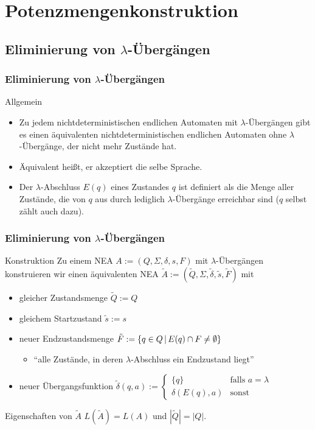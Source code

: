 \section{Potenzmengenkonstruktion}
\subsection{Eliminierung von $\lambda$-Übergängen}
\begin{frame}
	\frametitle{Eliminierung von $\lambda$-Übergängen}
	\begin{block}{Allgemein}
	\begin{itemize}
	 \item Zu jedem nichtdeterministischen endlichen Automaten mit $\lambda$-Übergängen gibt es einen äquivalenten nichtdeterministischen
	 endlichen Automaten ohne $\lambda$-Übergänge, der nicht mehr Zustände hat.
	 \item Äquivalent heißt, er akzeptiert die selbe Sprache.
	\item Der $\lambda$-Abschluss $E(q)$ eines Zustandes $q$ ist definiert als die Menge aller Zustände, die von $q$ aus durch lediglich $\lambda$-Übergänge erreichbar sind ($q$ selbst zählt auch dazu).
	\end{itemize}
	\end{block}
\end{frame}
\begin{frame}
\frametitle{Eliminierung von $\lambda$-Übergängen}
	\begin{block}{Konstruktion}
	Zu einem NEA \(A := (Q, \Sigma, \delta, s, F)\) mit $\lambda$-Übergängen konstruieren wir einen 
	  äquivalenten NEA \(\tilde{A} := (\tilde{Q}, \Sigma, \tilde{\delta}, \tilde{s}, \tilde{F})\) mit
	 \begin{itemize}
	 \item gleicher Zustandsmenge \(\tilde{Q} := Q\)
	 \item gleichem Startzustand \(\tilde{s} := s\)
	 \item neuer Endzustandsmenge \(\tilde{F} := \left\lbrace q \in Q \,\middle\vert\, E(q)\cap F \neq \emptyset \right\rbrace\)
	 \begin{itemize}
	 	\item ``alle Zustände, in deren $\lambda$-Abschluss ein Endzustand liegt''
	 \end{itemize}
	 \item neuer Übergangsfunktion $\tilde{\delta}(q,a) := 
	 \begin{cases}
	  \{q\}			& \text{falls $a = \lambda$} \\
	 \delta(E(q),a)	& \text{sonst}
	 \end{cases}$
	 \end{itemize}
	\end{block}
	\begin{block}{Eigenschaften von \(\tilde{A}\)}
	 \(L(\tilde{A}) = L(A)\) und \(|\tilde{Q}| = |Q|\).
	\end{block}

\end{frame}

